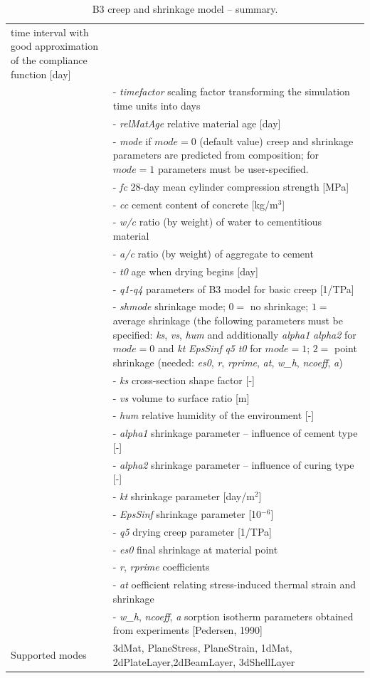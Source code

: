 \documentclass[a4paper]{article}
\newcommand{\param}[1]{{\it #1}}
\newenvironment{mmt}{\begin{tabular}{|l|p{9cm}|}}{\end{tabular}\\}
\newenvironment{mmt}{\begin{tabular}{|l|l|}}{\end{tabular}\\}
\begin{document}
\begin{table}[!htb]
\begin{mmt}
time interval with good approximation of the compliance function
[day]\\
&- \param{timefactor} scaling factor transforming the simulation time units into days\\
&- \param{relMatAge} relative material age [day]\\
%
&- \param{mode} if $mode = 0$ (default value) creep and shrinkage parameters are
predicted from composition; for $mode = 1$ parameters must be user-specified.\\
&- \param{fc} 28-day mean cylinder compression strength [MPa]\\
&- \param{cc} cement content of concrete [kg/m$^{3}$]\\
&- \param{w/c} ratio (by weight) of water to cementitious material\\
&- \param{a/c} ratio (by weight) of aggregate to cement \\
&- \param{t0} age when drying begins [day]\\
&- \param{q1-q4} parameters of B3 model for basic creep [1/TPa]\\
%
&- \param{shmode} shrinkage mode;
$0=$ no shrinkage;
$1=$ average shrinkage (the following parameters must be specified:
\param{ks}, \param{vs}, \param{hum} and additionally  \param{alpha1} \param{alpha2} for $mode = 0$
and \param{kt} \param{EpsSinf} \param{q5} \param{t0} for $mode = 1$;  
$2=$ point shrinkage (needed: \param{es0}, \param{r}, \param{rprime},
\param{at}, \param{w\_h}, \param{ncoeff}, \param{a})\\
%
&- \param{ks} cross-section shape factor [-]\\
&- \param{vs} volume to surface ratio [m]\\
&- \param{hum} relative humidity of the environment [-]\\
&- \param{alpha1} shrinkage parameter -- influence of cement type [-]\\
&- \param{alpha2} shrinkage parameter -- influence of curing type [-]\\
&- \param{kt} shrinkage parameter [day/m$^2$]\\
&- \param{EpsSinf} shrinkage parameter [10$^{-6}$]\\
&- \param{q5} drying creep parameter [1/TPa]\\
%
&- \param{es0} final shrinkage at material point\\
&- \param{r}, \param{rprime} coefficients\\
&- \param{at} oefficient relating stress-induced thermal strain and shrinkage\\
&- \param{w\_h}, \param{ncoeff}, \param{a} sorption isotherm parameters obtained from experiments [Pedersen, 1990] \\
%
Supported modes& 3dMat, PlaneStress, PlaneStrain, 1dMat,
2dPlateLayer,2dBeamLayer, 3dShellLayer\\
\hline
\end{mmt}
\caption{B3 creep and shrinkage model -- summary.}
\label{b3_table}
\end{table}
\end{document}
